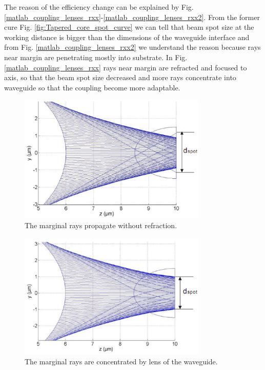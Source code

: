  
The reason of the efficiency change can be explained by Fig.  \ref{matlab_coupling_lenses_rxx}-\ref{matlab_coupling_lenses_rxx2}. From the former cure Fig. \ref{fig:Tapered_core_spot_curve} we can tell that beam spot size at the working distance is bigger than the dimensions of the waveguide interface and from Fig. \ref{matlab_coupling_lenses_rxx2} we understand the reason because rays near margin are penetrating mostly into substrate. In Fig. \ref{matlab_coupling_lenses_rxx} rays near margin are refracted and focused to axis, so that the beam spot size decreased and more rays concentrate into waveguide so that the coupling become more adaptable.   
\begin{figure}[!ht]
\includegraphics[width=0.8\textwidth]{bilder/beam_ray_without_refract}
\caption{The marginal rays propagate without refraction.}
\label{fig:matlab_coupling_lenses_rxx}
\end{figure}
\begin{figure}[!ht]
\includegraphics[width=0.8\textwidth]{bilder/beam_ray_refract}
\caption{The marginal rays are concentrated by lens of the waveguide.}
\label{fig:matlab_coupling_lenses_rxx2}
\end{figure}
